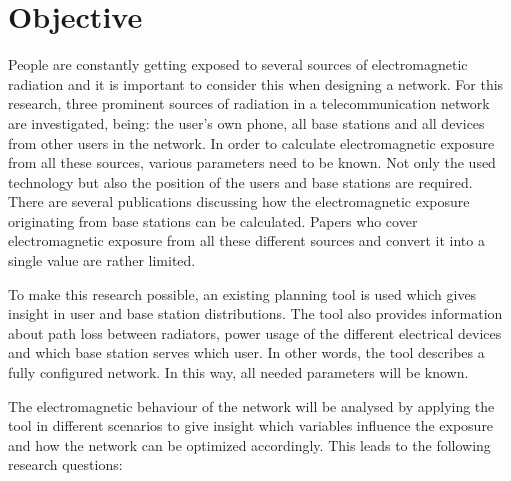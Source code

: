 \section{Objective}
\label{sec:objective}
People are constantly getting exposed to several sources of electromagnetic radiation and it is important to consider this when designing a network. For this research, three prominent sources of radiation in a telecommunication
network are investigated, being: the user's own phone, all base stations and all devices from other users in the network. In order to calculate electromagnetic 
exposure from all these sources, various parameters need to be known. Not only the used technology but also the position of the users and base stations 
are required. There are several publications discussing how the electromagnetic exposure originating from base stations can be calculated. 
Papers who cover electromagnetic exposure from all these different sources and convert it into a single value are rather limited.

To make this research possible, an existing planning tool is used which gives insight in user and base station distributions.
The tool also provides information about path loss between radiators, power usage of the different electrical devices and which base station serves which user. In other words, the tool describes 
a fully configured network.
In this way, all needed parameters will be known.

The electromagnetic behaviour of the network will be analysed by applying the tool in different scenarios to give insight which variables influence the exposure and how
the network can be optimized accordingly. This leads to the following research questions:




